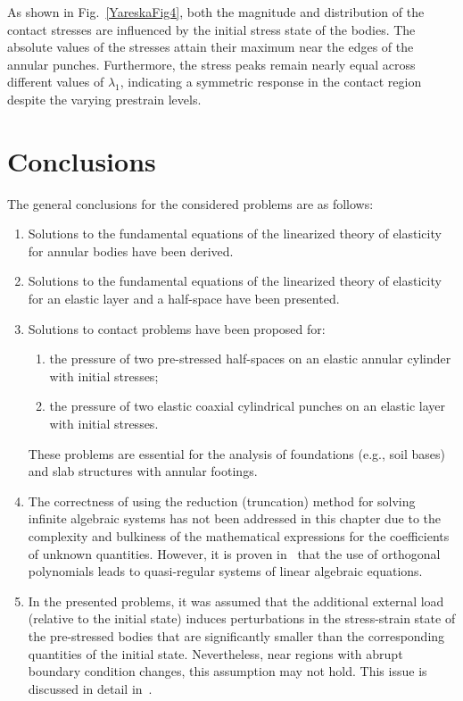  As shown in Fig.~\ref{YareskaFig4}, both the magnitude and distribution of the contact stresses are influenced by the initial stress state of the bodies. The absolute values of the stresses attain their maximum near the edges of the annular punches. Furthermore, the stress peaks remain nearly equal across different values of $\lambda_1$, indicating a symmetric response in the contact region despite the varying prestrain levels.

\section{Conclusions}

The general conclusions for the considered problems are as follows:

\begin{enumerate}
	\item Solutions to the fundamental equations of the linearized theory of elasticity for annular bodies have been derived.
	\item Solutions to the fundamental equations of the linearized theory of elasticity for an elastic layer and a half-space have been presented.
	\item Solutions to contact problems have been proposed for:
	\begin{enumerate}
		\item the pressure of two pre-stressed half-spaces on an elastic annular cylinder with initial stresses;
		\item the pressure of two elastic coaxial cylindrical punches on an elastic layer with initial stresses.
	\end{enumerate}
	These problems are essential for the analysis of foundations (e.g., soil bases) and slab structures with annular footings.
	
	\item The correctness of using the reduction (truncation) method for solving infinite algebraic systems has not been addressed in this chapter due to the complexity and bulkiness of the mathematical expressions for the coefficients of unknown quantities. However, it is proven in~\cite{YaretskaRef1} that the use of orthogonal polynomials leads to quasi-regular systems of linear algebraic equations.
	
	\item In the presented problems, it was assumed that the additional external load (relative to the initial state) induces perturbations in the stress-strain state of the pre-stressed bodies that are significantly smaller than the corresponding quantities of the initial state. Nevertheless, near regions with abrupt boundary condition changes, this assumption may not hold. This issue is discussed in detail in~\cite{YaretskaRef1, YaretskaRef20}.
\end{enumerate}

